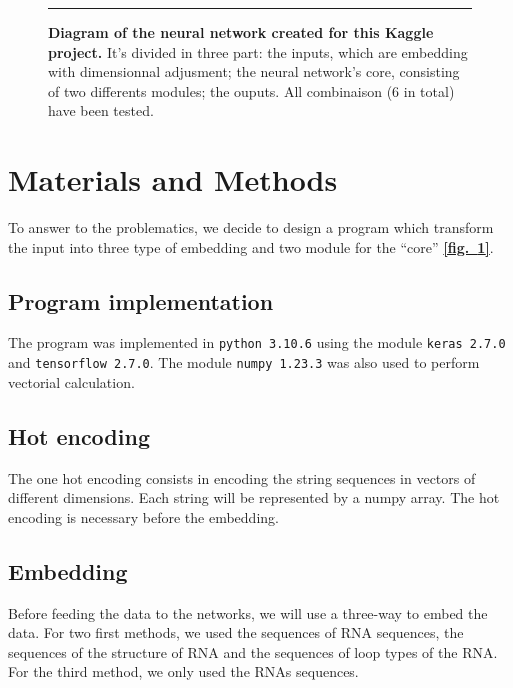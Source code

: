 \documentclass[12pt, oneside, a4paper]{report}
\newcommand{\fref}[1]{\hyperref[#1]{\textbf{[fig.~\ref*{#1}]}}}
\begin{document}
\begin{multicols}{2}
\begin{figure}[!tb]
    \hrule height 1pt
    
    \vspace{1ex}
    
    \caption{
        \textbf{Diagram of the neural network created for this Kaggle project.} It's divided in three part: the inputs, which are embedding with dimensionnal adjusment; the neural network's core, consisting of two differents modules; the ouputs. All combinaison (6 in total) have been tested.
        \label{f:Scheme_neural_network}}
\end{figure}

\section{Materials and Methods}
To answer to the problematics, we decide to design a program which transform the input into three type of embedding and two module for the ``core'' \fref{f:Scheme_neural_network}.

\subsection{Program implementation}
The program was implemented in \texttt{python 3.10.6} using the module \texttt{keras 2.7.0} and \texttt{tensorflow 2.7.0}. The module \texttt{numpy 1.23.3} was also used to perform vectorial calculation.

\subsection{Hot encoding}
The one hot encoding consists in encoding the string sequences in vectors of different dimensions. Each string will be represented by a numpy array. The hot encoding is necessary before the embedding.

\subsection{Embedding}
Before feeding the data to the networks, we will use a three-way to embed the data. For two first methods, we used the sequences of RNA sequences, the sequences of the structure of RNA and the sequences of loop types of the RNA. For the third method, we only used the RNAs sequences.


\end{multicols}
\end{document}

